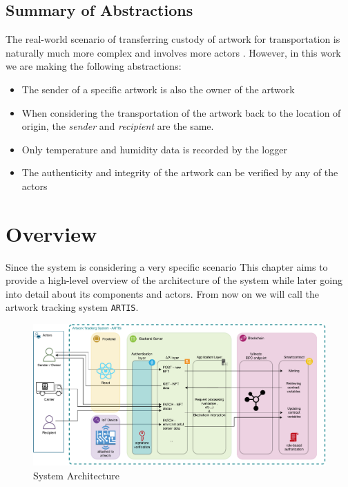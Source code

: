 \subsection*{Summary of Abstractions}
The real-world scenario of transferring custody of artwork for transportation is naturally much more complex and involves more actors \cite{artintransit}. However, in this work we are making the following abstractions:
\begin{itemize}
    \item The sender of a specific artwork is also the owner of the artwork
    \item When considering the transportation of the artwork back to the location of origin, the \textit{sender} and \textit{recipient} are the same.
    \item Only temperature and humidity data is recorded by the logger
    \item The authenticity and integrity of the artwork can be verified by any of the actors
\end{itemize}



\section{Overview}
\label{sec:overview}
Since the system is considering a very specific scenario This chapter aims to provide a high-level overview of the architecture of the system while later going into detail about its components and actors. From now on we will call the artwork tracking system \texttt{ARTIS}.

\begin{figure}[ht]
    \label{fig:architecture}
    \centering
    \includegraphics[width=\textwidth, keepaspectratio]{diagrams/architecture.drawio.pdf}
    \caption{System Architecture}
\end{figure}

